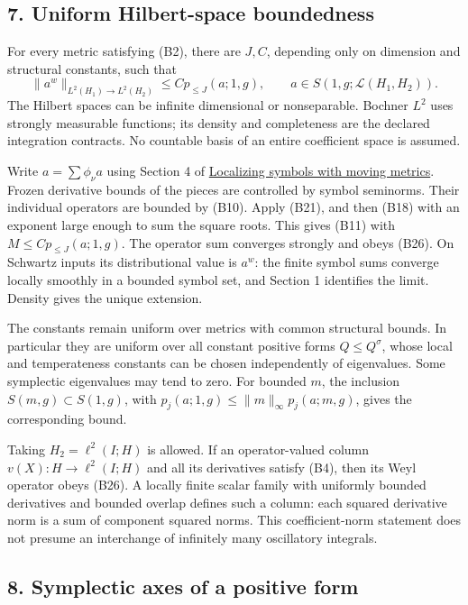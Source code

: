 \documentclass[
  11pt,
]{article}
\begin{document}
\subsection{7. Uniform Hilbert-space
boundedness}\label{uniform-hilbert-space-boundedness}

For every metric satisfying (B2), there are \(J,C\), depending only on
dimension and structural constants, such that \[
 \|a^w\|_{L^2(H_1)\to L^2(H_2)}
 \le Cp_{\le J}(a;1,g),\qquad
 a\in S(1,g;\mathcal L(H_1,H_2)).
 \tag{B26}
\] The Hilbert spaces can be infinite dimensional or nonseparable.
Bochner \(L^2\) uses strongly measurable functions; its density and
completeness are the declared integration contracts. No countable basis
of an entire coefficient space is assumed.

Write \(a=\sum\phi_\nu a\) using Section 4 of
\href{metric-localization.pdf}{Localizing symbols with moving metrics}.
Frozen derivative bounds of the pieces are controlled by symbol
seminorms. Their individual operators are bounded by (B10). Apply (B21),
and then (B18) with an exponent large enough to sum the square roots.
This gives (B11) with \(M\le Cp_{\le J}(a;1,g)\). The operator sum
converges strongly and obeys (B26). On Schwartz inputs its
distributional value is \(a^w\): the finite symbol sums converge locally
smoothly in a bounded symbol set, and Section 1 identifies the limit.
Density gives the unique extension.

The constants remain uniform over metrics with common structural bounds.
In particular they are uniform over all constant positive forms
\(Q\le Q^\sigma\), whose local and temperateness constants can be chosen
independently of eigenvalues. Some symplectic eigenvalues may tend to
zero. For bounded \(m\), the inclusion \(S(m,g)\subset S(1,g)\), with
\(p_j(a;1,g)\le\|m\|_\infty p_j(a;m,g)\), gives the corresponding bound.

Taking \(H_2=\ell^2(I;H)\) is allowed. If an operator-valued column
\(v(X):H\to\ell^2(I;H)\) and all its derivatives satisfy (B4), then its
Weyl operator obeys (B26). A locally finite scalar family with uniformly
bounded derivatives and bounded overlap defines such a column: each
squared derivative norm is a sum of component squared norms. This
coefficient-norm statement does not presume an interchange of infinitely
many oscillatory integrals.

\subsection{8. Symplectic axes of a positive
form}\label{symplectic-axes-of-a-positive-form}
\end{document}
